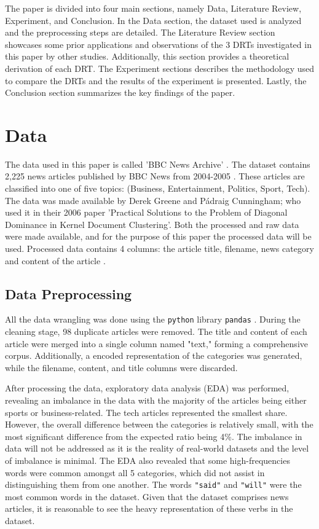 \documentclass[12pt]{article}
\begin{document}
The paper is divided into four main sections, namely Data, Literature Review, Experiment, and Conclusion. In the Data section, the dataset used is analyzed and the preprocessing steps are detailed. The Literature Review section showcases some prior applications and observations of the 3 DRTs investigated in this paper by other studies. Additionally, this section provides a theoretical derivation of each DRT. The Experiment sections describes the methodology used to compare the DRTs and the results of the experiment is presented. Lastly, the Conclusion section summarizes the key findings of the paper.

\section{Data}
\hspace{\parindent} The data used in this paper is called 'BBC News Archive' \parencite{greene06icml}. The dataset contains 2,225 news articles published by BBC News from 2004-2005 \parencite{greene06icml}. These articles are classified into one of five topics: (Business, Entertainment, Politics, Sport, Tech). The data was made available by Derek Greene and P\'{a}draig Cunningham; who used it in their 2006 paper 'Practical Solutions to the Problem of Diagonal Dominance in Kernel Document Clustering'. Both the processed and raw data were made available, and for the purpose of this paper the processed data will be used. Processed data contains 4 columns: the article title, filename, news category and content of the article \parencite{greene06icml}.

\subsection{Data Preprocessing}
\hspace{\parindent} All the data wrangling was done using the \texttt{python} library \texttt{pandas} \parencite{mckinney2010data}. During the cleaning stage, 98 duplicate articles were removed. The title and content of each article were merged into a single column named "text," forming a comprehensive corpus. Additionally, a encoded representation of the categories was generated, while the filename, content, and title columns were discarded.

After processing the data, exploratory data analysis (EDA) was performed, revealing an imbalance in the data with the majority of the articles being either sports or business-related. The tech articles represented the smallest share. However, the overall difference between the categories is relatively small, with the most significant difference from the expected ratio being 4\%. The imbalance in data will not be addressed as it is the reality of real-world datasets and the level of imbalance is minimal. The EDA also revealed that some high-frequencies words were common amongst all 5 categories, which did not assist in distinguishing them from one another. The words \texttt{"said"} and \texttt{"will"} were the most common words in the dataset. Given that the dataset comprises news articles, it is reasonable to see the heavy representation of these verbs in the dataset.
\end{document}
